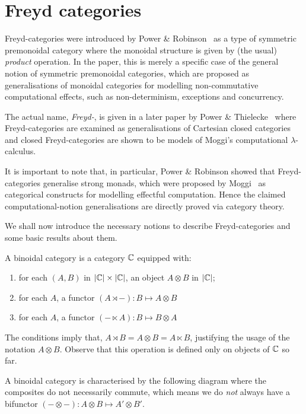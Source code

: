 \section{Freyd categories}

Freyd-categories were introduced by Power \& Robinson~\cite{pow-rob} as a type
of symmetric premonoidal category where the monoidal structure is given by
(the usual) \emph{product} operation. In the paper, this is merely a specific
case of the general notion of symmetric premonoidal categories, which are
proposed as generalisations of monoidal categories for modelling
non-commutative computational effects, such as non-determinism, exceptions and
concurrency.

The actual name, \emph{Freyd-}, is given in a later paper by Power \&
Thielecke~\cite{pow-thie} where Freyd-categories are examined as generalisations
of Cartesian closed categories and closed Freyd-categories are shown to be
models of Moggi's computational $\lambda$-calculus.

It is important to note that, in particular, Power \& Robinson showed that
Freyd-categories generalise strong monads, which were proposed by
Moggi~\cite{moggi-89} as categorical constructs for modelling effectful
computation. Hence the claimed computational-notion generalisations are
directly proved via category theory.

We shall now introduce the necessary notions to describe Freyd-categories and
some basic results about them.

\begin{definition}
    A binoidal category is a category $\mathbb{C}$ equipped with:
    \begin{enumerate}
        \item for each $(A, B)$ in $|\mathbb{C}| \times |\mathbb{C}|$, an object $A \otimes B$
            in $|\mathbb{C}|$;
        \item for each $A$, a functor $(A \rtimes -) : B \mapsto A \otimes B$
        \item for each $A$, a functor $(- \ltimes A) : B \mapsto B \otimes A$
    \end{enumerate}
\end{definition}

The conditions imply that, $A \rtimes B = A \otimes B = A \ltimes B$,
justifying the usage of the notation $A \otimes B$. Observe that this
operation is defined only on objects of $\mathbb{C}$ so far.

A binoidal category is characterised by the following diagram
\binoidaldiag
where the composites do not necessarily commute, which means we do \emph{not}
always have a bifunctor $(- \otimes -): A\otimes B \mapsto A' \otimes B'$.

